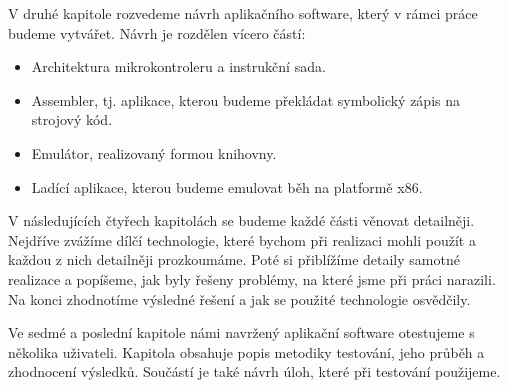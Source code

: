 \begin{introduction}
V druhé kapitole rozvedeme návrh aplikačního software, který v rámci práce budeme vytvářet. Návrh je rozdělen vícero částí:

\begin{itemize}
	\item Architektura mikrokontroleru a instrukční sada.
	\item Assembler, tj. aplikace, kterou budeme překládat symbolický zápis na strojový kód.
	\item Emulátor, realizovaný formou knihovny.
	\item Ladící aplikace, kterou budeme emulovat běh na platformě x86.
\end{itemize}

V následujících čtyřech kapitolách se budeme každé části věnovat detailněji. Nejdříve zvážíme dílčí technologie, které bychom při realizaci mohli použít a každou z nich detailněji prozkoumáme. Poté si přiblížíme detaily samotné realizace a popíšeme, jak byly řešeny problémy, na které jsme při práci narazili. Na konci zhodnotíme výsledné řešení a jak se použité technologie osvědčily.

Ve sedmé a poslední kapitole námi navržený aplikační software otestujeme s několika uživateli. Kapitola obsahuje popis metodiky testování, jeho průběh a zhodnocení výsledků. Součástí je také návrh úloh, které při testování použijeme.

\end{introduction}
